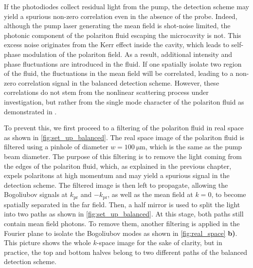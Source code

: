 \indent If the photodiodes collect residual light from the pump, the detection scheme may yield a spurious non-zero correlation even in the absence of the probe. Indeed, although the pump laser generating the mean field is shot-noise limited, the photonic component of the polariton fluid escaping the microcavity is not.
This excess noise originates from the Kerr effect inside the cavity, which leads to self-phase modulation of the polariton field. As a result, additional intensity and phase fluctuations are introduced in the fluid. If one spatially isolate two region of the fluid, the fluctuations in the mean field will be correlated, leading to a non-zero correlation signal in the balanced detection scheme.
However, these correlations do not stem from the nonlinear scattering process under investigation, but rather from the single mode character of the polariton fluid as demonstrated in \cite{a_baas_quantum_degeneracy2006}.

\bigskip

\indent To prevent this, we first proceed to a filtering of the polariton fluid in real space as shown in \autoref{fig:set_up_balanced}. The real space image of the polariton fluid is filtered using a pinhole of diameter $w=\SI{100}{\micro\meter}$, which is the same as the pump beam diameter.
The purpose of this filtering is to remove the light coming from the edges of the polariton fluid, which, as explained in the previous chapter, expels polaritons at high momentum and may yield a spurious signal in the detection scheme.
The filtered image is then left to propagate, allowing the Bogoliubov signals at $k_{\mathrm{pr}}$ and $-k_{\mathrm{pr}}$, as well as the mean field at $k = 0$, to become spatially separated in the far field.
 Then, a half mirror is used to split the light into two paths as shown in \autoref{fig:set_up_balanced}.
At this stage, both paths still contain mean field photons. To remove them, another filtering is applied in the Fourier plane to isolate the Bogoliubov modes as shown in \autoref{fig:real_space} \textbf{b)}. This picture shows the whole $k$-space image for the sake of clarity, but in practice,
the top and bottom halves belong to two different paths of the balanced detection scheme.


